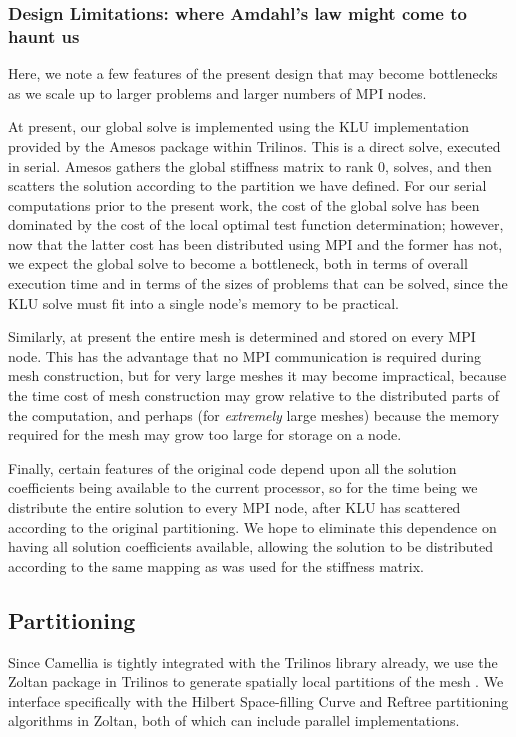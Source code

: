 \documentclass{article}
\begin{document}
\subsubsection{Design Limitations: where Amdahl's law might come to haunt us}
Here, we note a few features of the present design that may become bottlenecks as we scale up to larger problems and larger numbers of MPI nodes.

At present, our global solve is implemented using the KLU implementation provided by the Amesos package within Trilinos.  This is a direct solve, executed in serial.  Amesos gathers the global stiffness matrix to rank 0, solves, and then scatters the solution according to the partition we have defined.  For our serial computations prior to the present work, the cost of the global solve has been dominated by the cost of the local optimal test function determination; however, now that the latter cost has been distributed using MPI and the former has not, we expect the global solve to become a bottleneck, both in terms of overall execution time and in terms of the sizes of problems that can be solved, since the KLU solve must fit into a single node's memory to be practical.

Similarly, at present the entire mesh is determined and stored on every MPI node.  This has the advantage that no MPI communication is required during mesh construction, but for very large meshes it may become impractical, because the time cost of mesh construction may grow relative to the distributed parts of the computation, and perhaps (for \emph{extremely} large meshes) because the memory required for the mesh may grow too large for storage on a node.

Finally, certain features of the original code depend upon all the solution coefficients being available to the current processor, so for the time being we distribute the entire solution to every MPI node, after KLU has scattered according to the original partitioning.  We hope to eliminate this dependence on having all solution coefficients available, allowing the solution to be distributed according to the same mapping as was used for the stiffness matrix.

\subsection{Partitioning}

Since Camellia is tightly integrated with the Trilinos library already, we use the Zoltan package in Trilinos to generate spatially local partitions of the mesh \cite{ZoltanOverviewArticle}. We interface specifically with the Hilbert Space-filling Curve and Reftree partitioning algorithms in Zoltan, both of which can include parallel implementations. 
\end{document}
